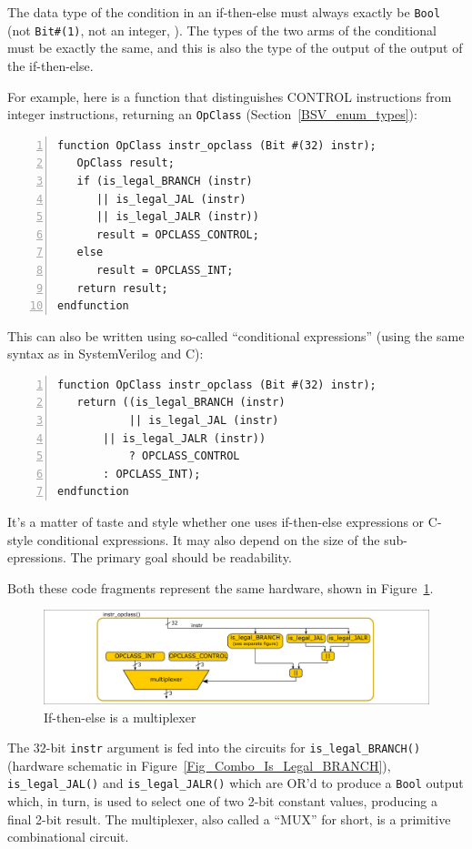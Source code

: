The data type of the condition in an if-then-else must always exactly
be \verb|Bool| (not \verb|Bit#(1)|, not an integer, {\etc}).  The
types of the two arms of the conditional must be exactly the same, and
this is also the type of the output of the output of the if-then-else.

For example, here is a function that distinguishes CONTROL
instructions from integer instructions, returning an \verb|OpClass|
(Section~\ref{BSV_enum_types}):

{\footnotesize
\begin{Verbatim}[frame=single, numbers=left]
function OpClass instr_opclass (Bit #(32) instr);
   OpClass result;
   if (is_legal_BRANCH (instr)
      || is_legal_JAL (instr)
      || is_legal_JALR (instr))
      result = OPCLASS_CONTROL;
   else
      result = OPCLASS_INT;
   return result;
endfunction
\end{Verbatim}
}

This can also be written using so-called ``conditional expressions''
(using the same syntax as in SystemVerilog and C):

{\footnotesize
\begin{Verbatim}[frame=single, numbers=left]
function OpClass instr_opclass (Bit #(32) instr);
   return ((is_legal_BRANCH (instr)
           || is_legal_JAL (instr)
	   || is_legal_JALR (instr))
           ? OPCLASS_CONTROL
	   : OPCLASS_INT);
endfunction
\end{Verbatim}
}

It's a matter of taste and style whether one uses if-then-else
expressions or C-style conditional expressions.  It may also depend on
the size of the sub-epressions.  The primary goal should be
readability.

Both these code fragments represent the same hardware, shown in
Figure~\ref{Fig_Combo_Multiplexer}.
\begin{figure}[htbp]
  \centerline{\includegraphics[width=6in,angle=0]{Figures/Fig_Combo_Multiplexer}}
  \caption{\label{Fig_Combo_Multiplexer}If-then-else is a multiplexer}
\end{figure}
The 32-bit \verb|instr| argument is fed into the circuits for
\verb|is_legal_BRANCH()| (hardware schematic in
Figure~\ref{Fig_Combo_Is_Legal_BRANCH}), \verb|is_legal_JAL()| and
\verb|is_legal_JALR()| which are OR'd to produce a \verb|Bool| output
which, in turn, is used to select one of two 2-bit constant values,
producing a final 2-bit result.  The multiplexer, also called a
``MUX'' for short, is a primitive combinational circuit.

